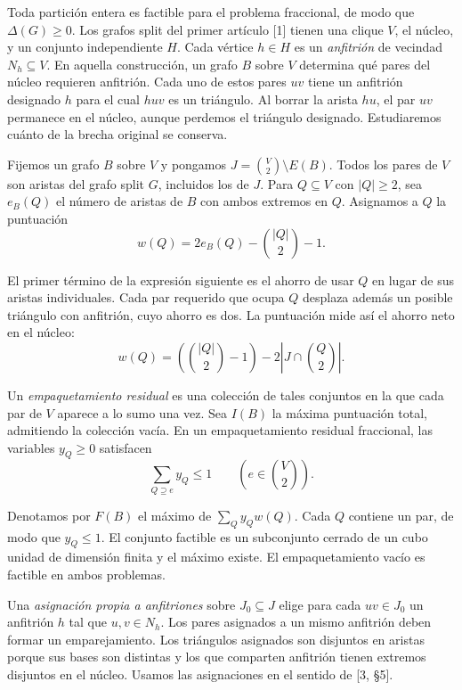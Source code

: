\documentclass[spanish,11pt,a4paper]{article}
\begin{document}
Toda partición entera es factible para el problema fraccional, de modo que \(\Delta(G)\ge0\). Los grafos split del primer artículo {[}1{]} tienen una clique \(V\), el núcleo, y un conjunto independiente \(H\). Cada vértice \(h\in H\) es un \emph{anfitrión} de vecindad \(N_h\subseteq V\). En aquella construcción, un grafo \(B\) sobre \(V\) determina qué pares del núcleo requieren anfitrión. Cada uno de estos pares \(uv\) tiene un anfitrión designado \(h\) para el cual \(huv\) es un triángulo. Al borrar la arista \(hu\), el par \(uv\) permanece en el núcleo, aunque perdemos el triángulo designado. Estudiaremos cuánto de la brecha original se conserva.

Fijemos un grafo \(B\) sobre \(V\) y pongamos \(J=\binom{V}{2}\setminus E(B)\). Todos los pares de \(V\) son aristas del grafo split \(G\), incluidos los de \(J\). Para \(Q\subseteq V\) con \(|Q|\ge2\), sea \(e_B(Q)\) el número de aristas de \(B\) con ambos extremos en \(Q\). Asignamos a \(Q\) la puntuación
\[
w(Q)=2e_B(Q)-\binom{|Q|}{2}-1.
\]

El primer término de la expresión siguiente es el ahorro de usar \(Q\) en lugar de sus aristas individuales. Cada par requerido que ocupa \(Q\) desplaza además un posible triángulo con anfitrión, cuyo ahorro es dos. La puntuación mide así el ahorro neto en el núcleo: \[
w(Q)=\left(\binom{|Q|}{2}-1\right)-2\left|J\cap\binom{Q}{2}\right|.
\]

Un \emph{empaquetamiento residual} es una colección de tales conjuntos en la que cada par de \(V\) aparece a lo sumo una vez. Sea \(I(B)\) la máxima puntuación total, admitiendo la colección vacía. En un empaquetamiento residual fraccional, las variables \(y_Q\ge0\) satisfacen
\[
\sum_{Q\supseteq e}y_Q\le1 \qquad \left(e\in\binom{V}{2}\right).
\]

Denotamos por \(F(B)\) el máximo de \(\sum_Q y_Qw(Q)\). Cada \(Q\) contiene un par, de modo que \(y_Q\le1\). El conjunto factible es un subconjunto cerrado de un cubo unidad de dimensión finita y el máximo existe. El empaquetamiento vacío es factible en ambos problemas.

Una \emph{asignación propia a anfitriones} sobre \(J_0\subseteq J\) elige para cada \(uv\in J_0\) un anfitrión \(h\) tal que \(u,v\in N_h\). Los pares asignados a un mismo anfitrión deben formar un emparejamiento. Los triángulos asignados son disjuntos en aristas porque sus bases son distintas y los que comparten anfitrión tienen extremos disjuntos en el núcleo. Usamos las asignaciones en el sentido de {[}3, §5{]}.
\end{document}
